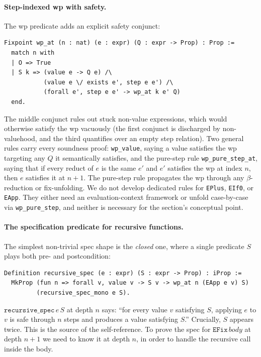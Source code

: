 \paragraph{Step-indexed wp with safety.}
The wp predicate adds an explicit safety conjunct:
\begin{lstlisting}
Fixpoint wp_at (n : nat) (e : expr) (Q : expr -> Prop) : Prop :=
  match n with
  | O => True
  | S k => (value e -> Q e) /\
           (value e \/ exists e', step e e') /\
           (forall e', step e e' -> wp_at k e' Q)
  end.
\end{lstlisting}
\noindent
The middle conjunct rules out stuck non-value expressions, which
would otherwise satisfy the wp vacuously (the first conjunct is
discharged by non-valuehood, and the third quantifies over an empty
step relation).  Two general rules carry every soundness proof:
\texttt{wp\_value}, saying a value satisfies the wp targeting any $Q$
it semantically satisfies, and the pure-step rule \texttt{wp\_pure\_step\_at},
saying that if every reduct of $e$ is the same $e'$ and $e'$
satisfies the wp at index $n$, then $e$ satisfies it at $n+1$.  The
pure-step rule propagates the wp through any $\beta$-reduction or
fix-unfolding.  We do not develop dedicated rules for \texttt{EPlus},
\texttt{EIf0}, or \texttt{EApp}. They either need an evaluation-context
framework or unfold case-by-case via \texttt{wp\_pure\_step}, and
neither is necessary for the section's conceptual point.

\paragraph{The specification predicate for recursive functions.}
The simplest non-trivial spec shape is the \emph{closed} one, where a
single predicate $S$ plays both pre- and postcondition:
\begin{lstlisting}
Definition recursive_spec (e : expr) (S : expr -> Prop) : iProp :=
  MkProp (fun n => forall v, value v -> S v -> wp_at n (EApp e v) S)
         (recursive_spec_mono e S).
\end{lstlisting}
\noindent
$\mathtt{recursive\_spec}\, e\, S$ at depth $n$ says: ``for every
value $v$ satisfying $S$, applying $e$ to $v$ is safe through $n$
steps and produces a value satisfying $S$.''  Crucially, $S$ appears
twice. This is the source of the self-reference.  To prove the spec
for $\mathtt{EFix}\, body$ at depth $n+1$ we need to know it at depth
$n$, in order to handle the recursive call inside the body.

